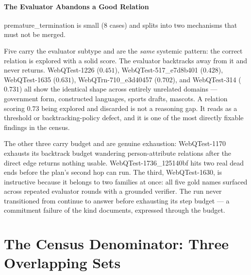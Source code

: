 \paragraph{The Evaluator Abandons a Good Relation}

\textsf{premature\_termination} is small ($8$ cases) and splits into two
mechanisms that must not be merged.

Five carry the \textsf{evaluator} subtype and are the \emph{same} systemic
pattern: the correct relation is explored with a solid score. The evaluator
backtracks away from it and never returns. \textsf{WebQTest-1226} ($0.451$),
\textsf{WebQTest-517\_e7d8b401} ($0.428$), \textsf{WebQTest-1635} ($0.631$),
\textsf{WebQTrn-710\_e3d40457} ($0.702$), and \textsf{WebQTest-314} ($0.731$)
all show the identical shape across entirely unrelated domains --- government
form, constructed languages, sports drafts, mascots. A relation scoring $0.73$
being explored and discarded is not a reasoning gap. It reads as a threshold or
backtracking-policy defect, and it is one of the most directly fixable findings
in the census.

The other three carry \textsf{budget} and are genuine exhaustion:
\textsf{WebQTest-1170} exhausts its backtrack budget wandering person-attribute
relations after the direct edge returns nothing usable.
\textsf{WebQTest-1736\_125140bf} hits two real dead ends before the plan's
second hop can run. The third, \textsf{WebQTest-1630}, is instructive because it
belongs to two families at once: all five gold names surfaced across repeated
evaluator rounds with a grounded verifier. The run never transitioned from
\textsf{continue} to \textsf{answer} before exhausting its step budget --- a
commitment failure of the kind  documents,
expressed through the budget.


\section{The Census Denominator: Three Overlapping
Sets}\label{app:census-denominator}

